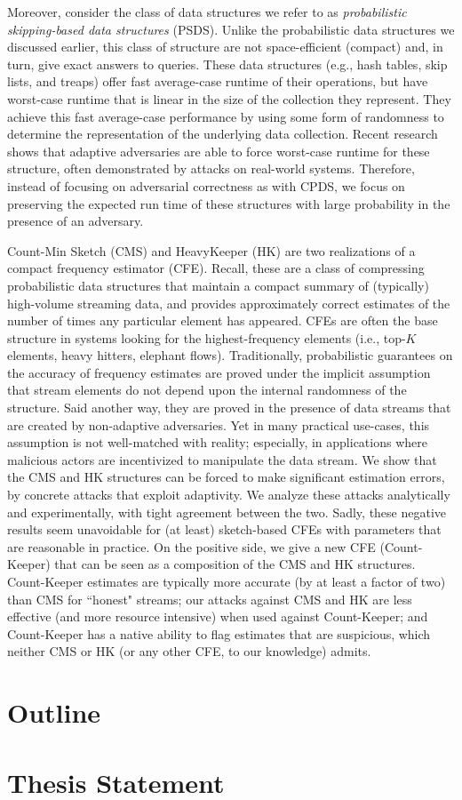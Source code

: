 Moreover, consider the class of data structures we refer to as \emph{probabilistic skipping-based data structures} (PSDS). Unlike the probabilistic data structures we discussed earlier, this class of structure are not space-efficient (compact) and, in turn, give exact answers to queries. These data structures (e.g., hash tables, skip lists, and treaps) offer fast average-case runtime of their operations, but have worst-case runtime that is linear in the size of the collection they represent. They achieve this fast average-case performance by using some form of randomness to determine the representation of the underlying data collection.  Recent research shows that adaptive adversaries are able to force worst-case runtime for these structure, often demonstrated by attacks on real-world systems. Therefore, instead of focusing on adversarial correctness as with CPDS, we focus on preserving the expected run time of these structures with large probability in the presence of an adversary.

Count-Min Sketch (CMS) and HeavyKeeper (HK) are two realizations of a compact frequency estimator (CFE).  Recall, these are a class of compressing probabilistic data structures that maintain a compact summary of (typically) high-volume streaming data, and provides approximately correct estimates of the number of times any particular element has appeared. CFEs are often the base structure in systems looking for the highest-frequency elements (i.e., top-$K$ elements, heavy hitters, elephant flows).  Traditionally, probabilistic guarantees on the accuracy of frequency estimates are proved under the implicit assumption that stream elements do not depend upon the internal randomness of the structure. Said another way, they are proved in the presence of data streams that are created by non-adaptive adversaries.  Yet in many practical use-cases, this assumption is not well-matched with reality; especially, in applications where malicious actors are incentivized to manipulate the data stream.  We show that the CMS and HK structures can be forced to make significant estimation errors, by concrete attacks that exploit adaptivity.  We analyze these attacks analytically and experimentally, with tight agreement between the two.  Sadly, these negative results seem unavoidable for (at least) sketch-based CFEs with parameters that are reasonable in practice. On the positive side, we give a new CFE (Count-Keeper) that can be seen as a composition of the CMS and HK structures. Count-Keeper estimates are typically more accurate (by at least a factor of two) than CMS for ``honest" streams; our attacks against CMS and HK are less effective (and more resource intensive) when used against Count-Keeper; and Count-Keeper has a native ability to flag estimates that are suspicious, which neither CMS or HK (or any other CFE, to our knowledge) admits.


\section{Outline}

\section{Thesis Statement}